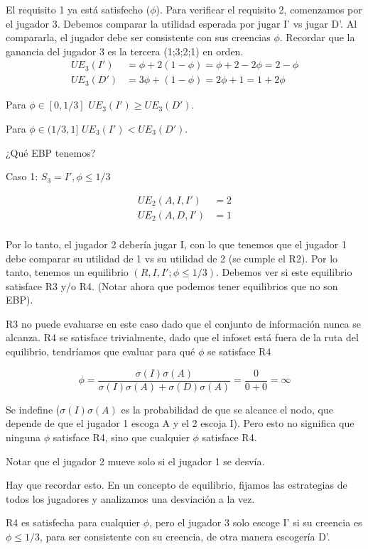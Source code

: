 \documentclass[12pt]{article}
\newcommand{\UE}[2]{UE_{\text{#1}}(#2)}
\begin{document}
El requisito 1 ya está satisfecho ($ \phi $). Para verificar el requisito 2, comenzamos por el jugador 3. Debemos comparar la utilidad esperada por jugar I' vs jugar D'. Al compararla, el jugador debe ser consistente con sus creencias $ \phi $.
Recordar que la ganancia del jugador 3 es la tercera (1;3;2;1) en orden.
\begin{align*}
	\UE{3}{I'} & =\phi + 2(1-\phi) = \phi + 2 - 2\phi = 2-\phi \\
	\UE{3}{D'} & =3\phi + (1-\phi) = 2\phi + 1 = 1+2\phi
\end{align*}

Para $ \phi \in [0, 1/3] $ $ \UE{3}{I'} \geq \UE{3}{D'} $.

Para $ \phi \in (1/3, 1] $ $ \UE{3}{I'} < \UE{3}{D'} $.

¿Qué EBP tenemos?

Caso 1: $ S_3 = I', \phi \leq 1/3 $

\begin{align*}
	\UE{2}{A, I, I'} & = 2 \\
	\UE{2}{A, D, I'} & = 1 \\
\end{align*}

Por lo tanto, el jugador 2 debería jugar I, con lo que tenemos que el jugador 1 debe comparar su utilidad de 1 vs su utilidad de 2 (se cumple el R2). Por lo tanto, tenemos un equilibrio $ (R, I, I'; \phi \leq 1/3) $. Debemos ver si este equilibrio satisface R3 y/o R4. (Notar ahora que podemos tener equilibrios que no son EBP).

R3 no puede evaluarse en este caso dado que el conjunto de información nunca se alcanza. R4 se satisface trivialmente, dado que el infoset está fuera de la ruta del equilibrio, tendríamos que evaluar para qué $ \phi $ se satisface R4

\[
	\phi = \frac{\sigma(I)\sigma(A)}{\sigma(I)\sigma(A) + \sigma(D)\sigma(A)} = \frac{0}{0+0} = \infty
\]

Se indefine ($ \sigma(I)\sigma(A) $ es la probabilidad de que se alcance el nodo, que depende de que el jugador 1 escoga A y el 2 escoja I). Pero esto no significa que ninguna $ \phi $ satisface R4, sino que cualquier $ \phi $ satisface R4.

Notar que el jugador 2 mueve solo si el jugador 1 se desvía.

Hay que recordar esto. En un concepto de equilibrio, fijamos las estrategias de todos los jugadores y analizamos una desviación a la vez.

R4 es satisfecha para cualquier $ \phi $, pero el jugador 3 solo escoge I' si su creencia es $ \phi \leq 1/3 $, para ser consistente con su creencia, de otra manera escogería D'.
\end{document}
